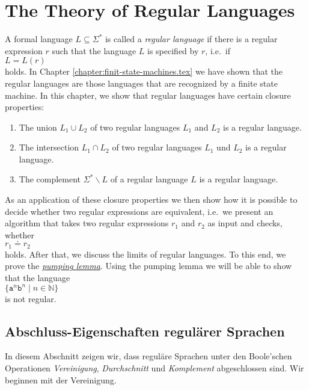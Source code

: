\chapter{The Theory of Regular Languages \label{chapter:regulaere-sprachen}}
A formal language $L \subseteq \Sigma^*$ is called a \emph{regular language} if there is a regular
expression $r$ such that the language $L$ is specified by $r$, i.e.~if
\\[0.2cm]
\hspace*{1.3cm}
$L = L(r)$ 
\\[0.2cm]
holds.  In Chapter \ref{chapter:finit-state-machines.tex} we have shown that the regular languages
are those languages that are recognized by a finite state machine.  In this chapter, we show
that regular languages have certain closure properties:
\begin{enumerate}
\item The union $L_1 \cup L_2$ of two regular languages $L_1$ and $L_2$ is a regular language.
\item The intersection $L_1 \cap L_2$ of two regular languages $L_1$ und $L_2$ is a regular language.
\item The complement $\Sigma^* \backslash L$ of a regular language $L$ is a regular language.
\end{enumerate}
As an application of these closure properties we then show how it is possible to decide whether two
regular expressions are equivalent, i.e.~we present an algorithm that takes two regular expressions
$r_1$ and $r_2$ as input and checks, whether 
\\[0.2cm]
\hspace*{1.3cm}
$r_1 \doteq r_2$
\\[0.2cm]
holds.  After that, we discuss the limits of regular languages.  To this end, we prove the
\href{http://en.wikipedia.org/wiki/Pumping_lemma_for_regular_languages}{\emph{pumping lemma}}.
Using the pumping lemma we will be able to show that the language
\\[0.2cm]
\hspace*{1.3cm} $\{ \mathtt{a}^n \mathtt{b}^n \mid n \in \mathbb{N} \}$
\\[0.2cm]
is not regular.

\section{Abschluss-Eigenschaften regul\"arer Sprachen}
In diesem Abschnitt zeigen wir, dass regul\"are Sprachen unter den Boole'schen Operationen
\emph{Vereinigung}, \emph{Durchschnitt} und \emph{Komplement} abgeschlossen sind.  Wir beginnen mit
der Vereinigung.  

